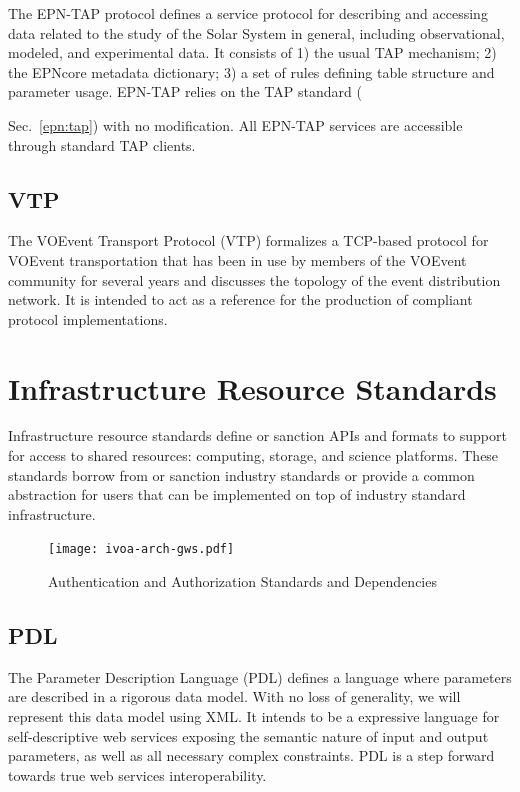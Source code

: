 \documentclass[11pt,letter]{ivoa}
\begin{document}
The EPN-TAP protocol \citep{2022ivoa.spec.0822E} defines a service
protocol for describing and accessing data related to the study of the
Solar System in general, including observational, modeled, and
experimental data. It consists of 1) the usual TAP mechanism; 2) the
EPNcore metadata dictionary; 3) a set of rules defining table structure
and parameter usage. EPN-TAP relies on the TAP standard
({Sec.~\ref{epn:tap}) with no modification. All EPN-TAP services are
accessible through standard TAP clients.


\subsection{VTP}

The VOEvent Transport Protocol (VTP) \citep{2017ivoa.spec.0320S}
formalizes a TCP-based protocol for VOEvent transportation
that has been in use by members of the VOEvent community for several
years and discusses
the topology of the event distribution network. It is intended to act as
a reference for
the production of compliant protocol implementations. 

\section{Infrastructure Resource Standards}
\label{gws}

Infrastructure resource standards define or sanction APIs and formats to
support for access
to shared resources: computing, storage, and science platforms. These
standards borrow from
or sanction industry standards or provide a common abstraction for users
that can be implemented
on top of industry standard infrastructure.

\begin{figure}[ht]
\centering
\texttt{[image: ivoa-arch-gws.pdf]}
\caption{Authentication and Authorization Standards and Dependencies}
\label{fig:gwsdeps}
\end{figure}

\subsection{PDL}

The Parameter Description Language (PDL) \citep{2014ivoa.spec.0523Z}
defines a language where parameters are described in a
rigorous data model. With no loss of generality, we will represent this
data model using
XML. It intends to be a expressive language for self-descriptive web
services exposing
the semantic nature of input and output parameters, as well as all
necessary complex
constraints. PDL is a step forward towards true web services
interoperability.
 
}
\end{document}
